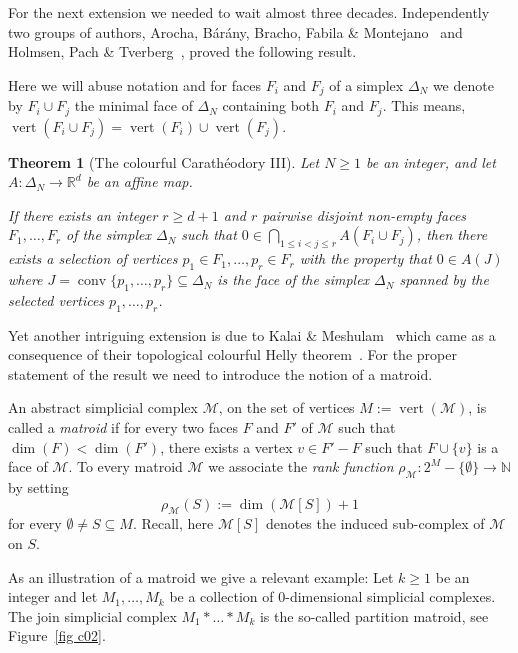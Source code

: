 \documentclass[a4paper,11pt,reqno, english]{amsart}
\newtheorem{theorem}{Theorem}[section]
\theoremstyle{definition}
\theoremstyle{remark}
\newcommand\R{\mathbb R}
\newcommand\N{\mathbb N}
\DeclareMathOperator{\vertex}{\mathrm{vert}}
\DeclareMathOperator{\conv}{\mathrm{conv}}
\begin{document}
\medskip
For the next extension we needed to wait almost three decades.
Independently two groups of authors, Arocha, B\'ar\'any, Bracho, Fabila \& Montejano~\cite[Thm.\,1]{ArochaBaranyBrachoFabilaMontejano2009} and Holmsen, Pach \& Tverberg~\cite[Thm.\,8]{HolmsenPachTverberg2008}, proved the following result.

\medskip
Here we will abuse notation and for faces $F_i$ and $F_j$ of a simplex $\Delta_N$ we denote by $F_i\cup F_j$ the minimal face of $\Delta_N$ containing both $F_i$ and $F_j$.
This means, $\vertex(F_i\cup F_j)=\vertex(F_i)\cup\vertex(F_j)$.

\medskip
\begin{theorem}[The colourful Carath\'eodory III]
	\label{th : colourful_Caratheodory_03}
	Let $N\geq 1$ be an integer, and let $A\colon \Delta_N\longrightarrow\R^d$ be an affine map.

	\smallskip\noindent
	If there exists an integer $r\geq d+1$ and $r$ pairwise disjoint non-empty faces $F_1,\dots, F_{r}$ of the simplex $\Delta_N$ such that
	$
		0\in \bigcap_{1\leq i<j\leq r} A(F_i\cup F_j)
	$,
	then there exists a selection of vertices $p_1\in F_1,\dots, p_r\in F_r$ with the property that $0\in A(J)$ where $J=\conv\{p_1,\dots,p_r\}\subseteq\Delta_N$ is the face of the simplex $\Delta_N$ spanned by the selected vertices  $p_1,\dots,p_r$.
\end{theorem}

\medskip
Yet another intriguing extension is due to Kalai \& Meshulam~\cite[Cor.\,1.4]{KalaiMeshulam2005} which came as a consequence of their topological colourful Helly theorem~\cite[Thm.\,1.6]{KalaiMeshulam2005}.
For the proper statement of the result we need to introduce the notion of a matroid.

\medskip
An abstract simplicial complex $\mathcal{M}$, on the set of vertices $M:=\vertex({\mathcal{M}})$, is called a {\em matroid} if for every two faces $F$ and $F'$ of $\mathcal{M}$ such that $\dim(F)<\dim(F')$, there exists a vertex $v\in F'-F$ such that $F\cup\{v\}$ is a face of $\mathcal{M}$.
To every matroid $\mathcal{M}$ we associate the {\em rank function} $\rho_{\mathcal{M}}\colon 2^{M}-\{\emptyset\}\longrightarrow\N$ by setting
\[
	\rho_{\mathcal{M}}(S):= \dim (\mathcal{M}[S])+1
\]
for every $\emptyset\neq S\subseteq M$.
Recall, here $\mathcal{M}[S]$ denotes the induced sub-complex of  $\mathcal{M}$ on $S$.

\medskip
As an illustration
of a matroid we give a relevant example: Let $k\geq 1$ be an integer and let $M_1,\dots,M_k$ be a collection of $0$-dimensional simplicial complexes.
The join simplicial complex $M_1*\dots*M_k$ is the so-called partition matroid, see Figure~\ref{fig c02}.
\end{document}
